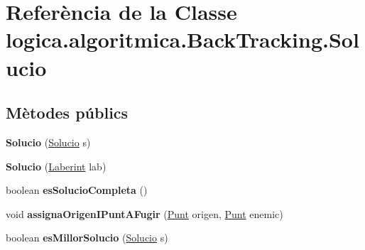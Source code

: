\hypertarget{classlogica_1_1algoritmica_1_1_back_tracking_1_1_solucio}{\section{Referència de la Classe logica.\+algoritmica.\+Back\+Tracking.\+Solucio}
\label{classlogica_1_1algoritmica_1_1_back_tracking_1_1_solucio}
}
\subsection*{Mètodes públics}
\begin{DoxyCompactItemize}
\item 
\hypertarget{classlogica_1_1algoritmica_1_1_back_tracking_1_1_solucio_a78c238865047b1231e0b4e8ad03a915e}{{\bfseries Solucio} (\hyperlink{classlogica_1_1algoritmica_1_1_back_tracking_1_1_solucio}{Solucio} s)}\label{classlogica_1_1algoritmica_1_1_back_tracking_1_1_solucio_a78c238865047b1231e0b4e8ad03a915e}

\item 
\hypertarget{classlogica_1_1algoritmica_1_1_back_tracking_1_1_solucio_ad5234eb9a522b98d9b85617e5f6a6aa9}{{\bfseries Solucio} (\hyperlink{classlogica_1_1laberints_1_1_laberint}{Laberint} lab)}\label{classlogica_1_1algoritmica_1_1_back_tracking_1_1_solucio_ad5234eb9a522b98d9b85617e5f6a6aa9}

\item 
\hypertarget{classlogica_1_1algoritmica_1_1_back_tracking_1_1_solucio_a57f299c219b3b09e317feac9e3e2eced}{boolean {\bfseries es\+Solucio\+Completa} ()}\label{classlogica_1_1algoritmica_1_1_back_tracking_1_1_solucio_a57f299c219b3b09e317feac9e3e2eced}

\item 
\hypertarget{classlogica_1_1algoritmica_1_1_back_tracking_1_1_solucio_a29b53a1b331c19b1c82a76c5019069e0}{void {\bfseries assigna\+Origen\+I\+Punt\+A\+Fugir} (\hyperlink{classlogica_1_1_punt}{Punt} origen, \hyperlink{classlogica_1_1_punt}{Punt} enemic)}\label{classlogica_1_1algoritmica_1_1_back_tracking_1_1_solucio_a29b53a1b331c19b1c82a76c5019069e0}

\item 
\hypertarget{classlogica_1_1algoritmica_1_1_back_tracking_1_1_solucio_a95cade88917d1b2e22f6d9506b33bd56}{boolean {\bfseries es\+Millor\+Solucio} (\hyperlink{classlogica_1_1algoritmica_1_1_back_tracking_1_1_solucio}{Solucio} s)}\label{classlogica_1_1algoritmica_1_1_back_tracking_1_1_solucio_a95cade88917d1b2e22f6d9506b33bd56}


\end{DoxyCompactItemize}
